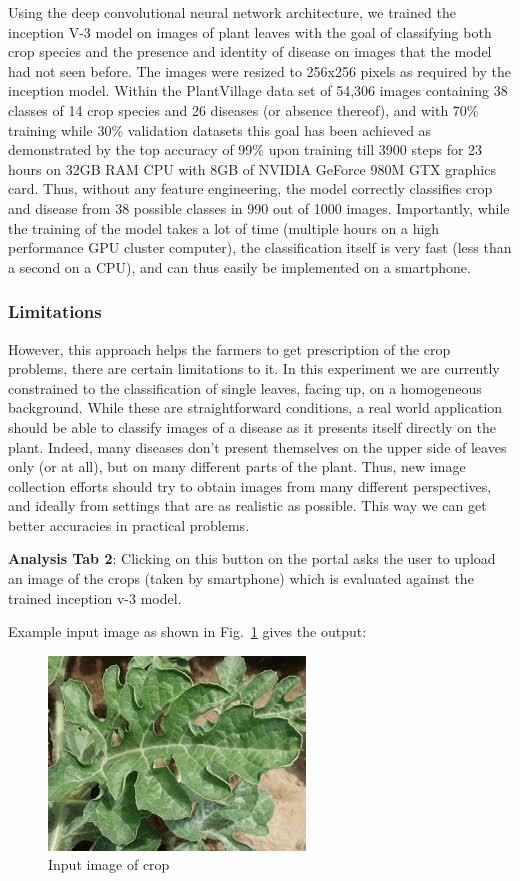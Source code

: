 Using the deep convolutional neural network architecture, we trained the inception V-3 model on images of plant leaves with the goal of classifying both crop species and the presence and identity of disease on images that the model had not seen before. The images were resized to 256x256 pixels as required by the inception model. Within the PlantVillage data set of 54,306 images containing 38 classes of 14 crop species and 26 diseases (or absence thereof), and with 70\% training while 30\% validation datasets this goal has been achieved as demonstrated by the top accuracy of 99\% upon training till 3900 steps for 23 hours on 32GB RAM CPU with 8GB of NVIDIA GeForce 980M GTX graphics card. Thus, without any feature engineering, the model correctly classifies crop and disease from 38 possible classes in 990 out of 1000 images. Importantly, while the training of the model takes a lot of time (multiple hours on a high performance GPU cluster computer), the classification itself is very fast (less than a second on a CPU), and can thus easily be implemented on a smartphone.


\subsubsection{Limitations}
However, this approach helps the farmers to get prescription of the crop problems, there are certain limitations to it. In this experiment we are currently constrained to  the classification of single leaves, facing up, on a homogeneous background. While these are straightforward conditions, a real world application should be able to classify images of a disease as it presents itself directly on the plant. Indeed, many diseases don’t present themselves on the upper side of leaves  only (or at all), but on many different parts of the plant. Thus, new image collection efforts should try to obtain images from many different perspectives, and ideally from settings that are as realistic as possible. This way we can get better accuracies in practical problems.

\textbf{Analysis Tab 2}: Clicking on this button on the portal asks the user to upload an image of the crops (taken by smartphone) which is evaluated against the trained inception v-3 model.


Example input image as shown in Fig.~\ref{fig: res-6} gives the output:

\begin{figure}[!h]
	\includegraphics[width=0.5\linewidth]{fin_img_21}
	\centering
	\caption{\label{fig: res-6}Input image of crop}
\end{figure}

